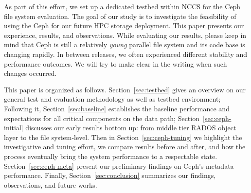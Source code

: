 As part of this effort, we set up a dedicated testbed within NCCS for the Ceph
file system evaluation. The goal of our study is to investigate the
feasibility of using the Ceph for our future HPC storage deployment.  This
paper presents our experience, results, and observations. While evaluating
our results, please keep in mind that Ceph is still a relatively
\textit{young} parallel file system and its code base is changing rapidly. In
between releases, we often experienced different stability and performance
outcomes.  We will try to make clear in the writing when such changes occurred.

This paper is organized as follows. Section~\ref{sec:testbed} gives an
overview on our general test and evaluation methodology as well as testbed
environment; Following it, Section~\ref{sec:baseline} establishes the baseline
performance and expectations for all critical components on the data path;
Section~\ref{sec:ceph-initial} discusses our early results bottom up: from
middle tier RADOS object layer to the file system-level. Then in
Section~\ref{sec:ceph-tuning} we highlight the investigative and tuning
effort, we compare results before and after, and how the process eventually
bring the system performance to a respectable state.
Section~\ref{sec:ceph-meta} present our preliminary findings on Ceph's
metadata performance. Finally, Section~\ref{sec:conclusion} summarizes our
findings, observations, and future works.
